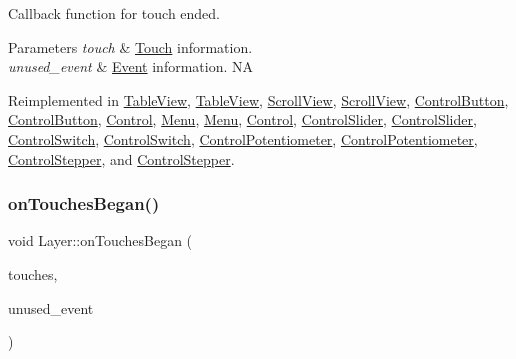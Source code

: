 Callback function for touch ended.


\begin{DoxyParams}{Parameters}
{\em touch} & \hyperlink{classTouch}{Touch} information. \\
\hline
{\em unused\+\_\+event} & \hyperlink{classEvent}{Event} information.  NA \\
\hline
\end{DoxyParams}


Reimplemented in \hyperlink{classTableView_a0d96aaf8ac40256ed144565beaaf76aa}{Table\+View}, \hyperlink{classTableView_a361d91c5c592b3d81ed43b6743487fc3}{Table\+View}, \hyperlink{classScrollView_aafc1076e1f21bc66749a4c814814d681}{Scroll\+View}, \hyperlink{classScrollView_a86f57715da926a475b75d67eff84701d}{Scroll\+View}, \hyperlink{classControlButton_a7597744c683964152429472a358b3fd2}{Control\+Button}, \hyperlink{classControlButton_a6f562dc0b399591189883ea7788603d7}{Control\+Button}, \hyperlink{classControl_af31a373d40a3181e2a97f0f9dc85c1f8}{Control}, \hyperlink{classMenu_ab8d24a11ed99eead18acd6376a0a3d76}{Menu}, \hyperlink{classMenu_a8d9a867ea2dfc4ec2a3309f3df71cc35}{Menu}, \hyperlink{classControl_a56073e57060169fe80cbb6ce1f4abe28}{Control}, \hyperlink{classControlSlider_a9ba0559605c93e08dc4548261cbc2773}{Control\+Slider}, \hyperlink{classControlSlider_acdda8fa6365ab06db757c0a525c5108e}{Control\+Slider}, \hyperlink{classControlSwitch_a6976aba81f0846eb827114efc06301d3}{Control\+Switch}, \hyperlink{classControlSwitch_a13db70a616ea0e992710fc8041792f66}{Control\+Switch}, \hyperlink{classControlPotentiometer_adb487a04c463b3cfbf63be0957cee24c}{Control\+Potentiometer}, \hyperlink{classControlPotentiometer_adfd4029e5b390ba94a0ba0373adbc5d9}{Control\+Potentiometer}, \hyperlink{classControlStepper_a7934349dae09881fce7a72d4985d0154}{Control\+Stepper}, and \hyperlink{classControlStepper_a55e6582294a0520d21e397c3a58cf57b}{Control\+Stepper}.

\mbox{\label{classLayer_a215f7865e3391ae605885af8b639277a}} 
\subsubsection{\texorpdfstring{on\+Touches\+Began()}{onTouchesBegan()}\hspace{0.1cm}{\footnotesize\ttfamily [1/2]}}
{\footnotesize\ttfamily void Layer\+::on\+Touches\+Began (\begin{DoxyParamCaption}\item[{const std\+::vector$<$ \hyperlink{classTouch}{Touch} $\ast$$>$ \&}]{touches,  }\item[{\hyperlink{classEvent}{Event} $\ast$}]{unused\+\_\+event }\end{DoxyParamCaption})\hspace{0.3cm}{\ttfamily [virtual]}}

